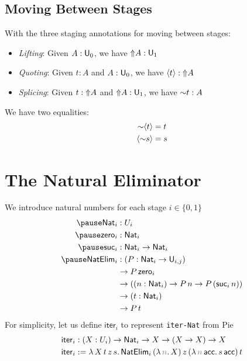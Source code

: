 \documentclass[handout]{beamer}
\newenvironment{fr}[1][]
{\begin{frame}[fragile,environment=fr,#1]}
{\end{frame}}
\begin{document}
\subsection{Moving Between Stages}
\begin{fr}{\subsecname}
    With the three staging annotations for moving between stages:
    \begin{itemize}
        \item \emph{Lifting}: Given $A : \mathsf{U}_0$, we have ${\Uparrow} A : \mathsf{U}_1$
        \item \emph{Quoting}: Given $t:A$ and $A:\mathsf{U}_0$, we have $\langle t\rangle:{\Uparrow} A$
        \item \emph{Splicing}: Given $t:{\Uparrow} A$ and ${\Uparrow} A: \mathsf{U}_1$, we have ${\sim} t: A$
    \end{itemize}
    We have two equalities:
    $$\begin{aligned}
        {\sim} \langle t\rangle &= t\\
        \langle {\sim} s\rangle &= s
    \end{aligned}$$
\end{fr}


\section{The Natural Eliminator}
\begin{fr}{\secname}

We introduce natural numbers for each stage $i\in\{0,1\}$
$$
\begin{aligned}
    \pause\mathsf{Nat}_i&:U_i\\
    \pause\mathsf{zero}_i&:\mathsf{Nat}_i\\
    \pause\mathsf{suc}_i&:\mathsf{Nat}_i\to\mathsf{Nat}_i\\
    \pause\mathsf{NatElim}_i&:(P:\mathsf{Nat}_i\to\mathsf{U}_{i,j})\\
    &\to P\,\mathsf{zero}_i\\
    &\to ((n:\mathsf{Nat}_i)\to P\,n\to P\,(\mathsf{suc}_i\,n))\\
    &\to(t:\mathsf{Nat}_i)\\
    &\to P\,t\\
\end{aligned}
$$
\pause
For simplicity, let us define $\mathsf{iter}_i$ to represent \texttt{iter-Nat} from Pie
$$
\begin{aligned}
    \mathsf{iter}_i&:(X:U_i)\to\mathsf{Nat}_i\to X\to (X\to X)\to X\\
    \mathsf{iter}_i&:=\lambda\,X\,t\,z\,s.\,\mathsf{NatElim}_i\,(\lambda\,\gray n.\,X)\,z\,(\lambda\,\gray n\,\mathsf{acc}.\,s\,\mathsf{acc})\,t\\

\end{aligned}
$$
\end{fr}
\end{document}
